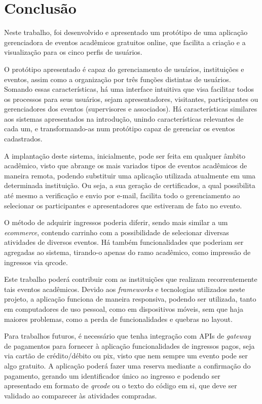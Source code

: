 \chapter{Conclusão}\label{chp:LABEL_CHP_6}

Neste trabalho, foi desenvolvido e apresentado um protótipo de uma aplicação gerenciadora de eventos acadêmicos gratuitos online, que facilita a criação e a visualização para os cinco perfis de usuários.

O protótipo apresentado é capaz do gerenciamento de usuários, instituições e eventos, assim como a organização por três funções distintas de usuários. Somando essas características, há uma interface intuitiva que visa facilitar todos os processos para seus usuários, sejam apresentadores, visitantes, participantes ou gerenciadores dos eventos (supervisores e associados). Há características similares aos sistemas apresentados na introdução, unindo características relevantes de cada um, e transformando-as num protótipo capaz de gerenciar os eventos cadastrados.

A implantação deste sistema, inicialmente, pode ser feita em qualquer âmbito acadêmico, visto que abrange os mais variados tipos de eventos acadêmicos de maneira remota, podendo substituir uma aplicação utilizada atualmente em uma determinada instituição. Ou seja, a sua geração de certificados, a qual possibilita até mesmo a verificação e envio por e-mail, facilita todo o gerenciamento ao selecionar os participantes e apresentadores que estiveram de fato no evento.

O método de adquirir ingressos poderia diferir, sendo mais similar a um \textit{ecommerce}, contendo carrinho com a possibilidade de selecionar diversas atividades de diversos eventos. Há também funcionalidades que poderiam ser agregadas ao sistema, tirando-o apenas do ramo acadêmico, como impressão de ingressos via qrcode. 

Este trabalho poderá contribuir com as instituições que realizam recorrentemente tais eventos acadêmicos. Devido aos \textit{frameworks} e tecnologias utilizados neste projeto, a aplicação funciona de maneira responsiva, podendo ser utilizada, tanto em computadores de uso pessoal, como em dispositivos móveis, sem que haja maiores problemas, como a perda de funcionalidades e quebras no layout.

Para trabalhos futuros, é necessário que tenha integração com APIs de \textit{gateway} de pagamentos para fornecer à aplicação funcionalidades de ingressos pagos, seja via cartão de crédito/débito ou pix, visto que nem sempre um evento pode ser algo gratuito. A aplicação poderá fazer uma reserva mediante a confirmação do pagamento, gerando um identificador único ao ingresso e podendo ser apresentado em formato de \textit{qrcode} ou o texto do código em si, que deve ser validado ao comparecer às atividades compradas. 

